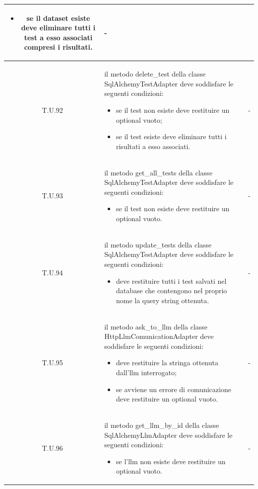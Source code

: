 \begin{tabularx}{\textwidth}{|c|X|c|}
\begin{itemize}
        \item se il dataset esiste deve eliminare tutti i test a esso associati compresi i risultati.
    \end{itemize} & - \\
    \hline 
    \label{tu:tu92} T.U.92 & il metodo delete\_test della classe SqlAlchemyTestAdapter deve soddisfare le seguenti condizioni:
    \begin{itemize}
        \item se il test non esiste deve restituire un optional vuoto;
        \item se il test esiste deve eliminare tutti i risultati a esso associati.
    \end{itemize} & - \\
    \hline 
    \label{tu:tu93} T.U.93 & il metodo get\_all\_tests della classe SqlAlchemyTestAdapter deve soddisfare le seguenti condizioni:
    \begin{itemize}
        \item se il test non esiste deve restituire un optional vuoto.
    \end{itemize} & - \\
    \hline 
    \label{tu:tu94} T.U.94 & il metodo update\_tests della classe SqlAlchemyTestAdapter deve soddisfare le seguenti condizioni:
    \begin{itemize}
        \item deve restituire tutti i test salvati nel database che contengono nel proprio nome la query string ottenuta.
    \end{itemize} & - \\
    \hline 
    \label{tu:tu95} T.U.95 & il metodo ask\_to\_llm della classe HttpLlmComunicationAdapter deve soddisfare le seguenti condizioni:
    \begin{itemize}
        \item deve restituire la stringa ottenuta dall'llm interrogato;
        \item se avviene un errore di comunicazione deve restituire un optional vuoto.
    \end{itemize} & - \\
    \hline 
    \label{tu:tu96} T.U.96 & il metodo get\_llm\_by\_id della classe SqlAlchemyLlmAdapter deve soddisfare le seguenti condizioni:
    \begin{itemize}
        \item se l'llm non esiste deve restituire un optional vuoto.
    \end{itemize} & - \\

\end{tabularx}
